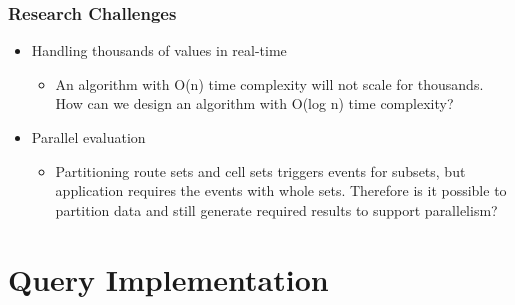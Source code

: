 \documentclass[handout]{beamer}
\begin{document}
\begin{frame}
\frametitle{Research Challenges}
\begin{itemize}
	\item Handling thousands of values in real-time
		\begin{itemize}
			\item An algorithm with O(n) time complexity will not scale for thousands. How can we design an algorithm with O(log n) time complexity?
		\end{itemize}
	\item Parallel evaluation
		\begin{itemize}
                        \item Partitioning route sets and cell sets triggers events for subsets, but application requires the events with whole sets. Therefore is it possible to partition data and still generate required results to support parallelism? 
                \end{itemize}
\end{itemize}

\end{frame}


\section{Query Implementation}
\end{document}
